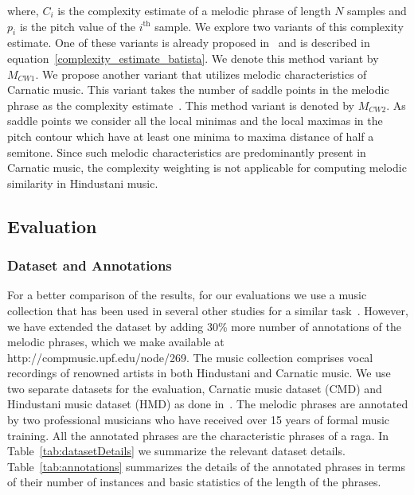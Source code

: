 \noindent where, $C_i$ is the complexity estimate of a melodic phrase of length $N$ samples and $p_i$ is the pitch value of the $i^{\mathrm{th}}$ sample. We explore two variants of this complexity estimate. One of these variants is already proposed in~\cite{batista2011complexity} and is described in equation~\ref{complexity_estimate_batista}. We denote this method variant by $M_{CW1}$. We propose another variant that utilizes melodic characteristics of Carnatic music. This variant takes the number of saddle points in the melodic phrase as the complexity estimate~\cite{Ishwar2013}. This method variant is denoted by $M_{CW2}$. As saddle points we consider all the local minimas and the local maximas in the pitch contour which have at least one minima to maxima distance of half a semitone. Since such melodic characteristics are predominantly present in Carnatic music, the complexity weighting is not applicable for computing melodic similarity in Hindustani music.


\subsection{Evaluation}
\label{sec:patterns_improving_similarity_evaluation}

\subsubsection{Dataset and Annotations}
\label{sec:patterns_improving_similarity_dataset_and_annotations}

For a better comparison of the results, for our evaluations we use a music collection  that has been used in several other studies for a similar task~\cite{gulati_ICASSP2015,Rao2014,Ross2012b}. However, we have extended the dataset by adding 30\% more number of annotations of the melodic phrases, which we make available at {http://compmusic.upf.edu/node/269}. The music collection comprises vocal recordings of renowned artists in both Hindustani and Carnatic music. We use two separate datasets for the evaluation, Carnatic music dataset (CMD) and Hindustani music dataset (HMD) as done in~\cite{gulati_ICASSP2015}. The melodic phrases are annotated by two professional musicians who have received over 15 years of formal music training. All the annotated phrases are the characteristic phrases of a \gls{raga}. In Table~\ref{tab:datasetDetails} we summarize the relevant dataset details. Table~\ref{tab:annotations} summarizes the details of the annotated phrases in terms of their number of instances and basic statistics of the length of the phrases.


